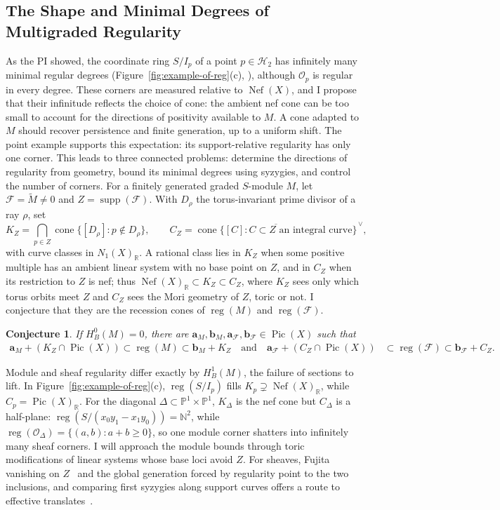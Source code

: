 \documentclass[11pt,reqno]{amsart}
\newtheorem{conjecture}[lemma]{Conjecture}
\theoremstyle{remark}
\newcommand{\reg}{\operatorname{reg}}
\newcommand{\Pic}{\operatorname{Pic}}
\newcommand{\supp}{\operatorname{supp}}
\newcommand{\Nef}{\operatorname{Nef}}
\newcommand{\cone}{\operatorname{cone}}
\renewcommand{\aa}{\mathbf{a}}
\newcommand{\bb}{\mathbf{b}}
\newcommand{\NN}{\mathbb{N}}
\newcommand{\PP}{\mathbb{P}}
\newcommand{\RR}{\mathbb{R}}
\newcommand{\cF}{\mathcal{F}}
\newcommand{\cH}{\mathcal{H}}
\newcommand{\cO}{\mathcal{O}}
\begin{document}
\subsection{The Shape and Minimal Degrees of Multigraded Regularity}\label{subsec:shape-of-regularity}
As the PI showed, the coordinate ring $S/I_p$ of a point $p\in\cH_2$ has infinitely many minimal regular degrees (Figure~\ref{fig:example-of-reg}(c), \cite{bruceHellerSayrafi22}), although $\cO_p$ is regular in every degree. These corners are measured relative to $\Nef(X)$, and I propose that their infinitude reflects the choice of cone: the ambient nef cone can be too small to account for the directions of positivity available to $M$. A cone adapted to $M$ should recover persistence and finite generation, up to a uniform shift. The point example supports this expectation: its support-relative regularity has only one corner. This leads to three connected problems: determine the directions of regularity from geometry, bound its minimal degrees using syzygies, and control the number of corners. For a finitely generated graded $S$-module $M$, let $\cF= \widetilde{M}\neq0$ and $Z=\supp(\cF)$. With $D_\rho$ the torus-invariant prime divisor of a ray $\rho$, set
\[
K_Z=\bigcap_{p\in Z}\cone\{[D_\rho]:p\notin D_\rho\},
\qquad
C_Z=\overline{\cone\{[C]:C\subset Z\text{ an integral curve}\}}^{\,\vee},
\]
with curve classes in $N_1(X)_{\RR}$. A rational class lies in $K_Z$ when some positive multiple has an ambient linear system with no base point on $Z$, and in $C_Z$ when its restriction to $Z$ is nef; thus $\Nef(X)_{\RR}\subset K_Z\subset C_Z$, where $K_Z$ sees only which torus orbits meet $Z$ and $C_Z$ sees the Mori geometry of $Z$, toric or not. I conjecture that they are the recession cones of $\reg(M)$ and $\reg(\cF)$.

\begin{conjecture}\label{conj:support-cone-duality}
If $H_B^0(M)=0$, there are $\aa_M,\bb_M,\aa_{\cF},\bb_{\cF}\in\Pic(X)$ such that
\[
\begin{aligned}
\aa_M+(K_Z\cap\Pic(X))\subset\reg(M)\subset\bb_M+K_Z \quad \text{and} \quad
\aa_{\cF}+(C_Z\cap\Pic(X))&\subset\reg(\cF)\subset\bb_{\cF}+C_Z.
\end{aligned}
\]
\end{conjecture}

Module and sheaf regularity differ exactly by $H_B^1(M)$, the failure of sections to lift. In Figure~\ref{fig:example-of-reg}(c), $\reg(S/I_p)$ fills $K_p\supsetneq\Nef(X)_{\RR}$, while $C_p=\Pic(X)_{\RR}$. For the diagonal $\Delta\subset\PP^1\times\PP^1$, $K_\Delta$ is the nef cone but $C_\Delta$ is a half-plane: $\reg(S/(x_0y_1-x_1y_0))=\NN^2$, while $\reg(\cO_\Delta)=\{(a,b):a+b\ge0\}$, so one module corner shatters into infinitely many sheaf corners. I will approach the module bounds through toric modifications of linear systems whose base loci avoid $Z$. For sheaves, Fujita vanishing on $Z$~\cite[Thm.~1.5]{keeler03} and the global generation forced by regularity point to the two inclusions, and comparing first syzygies along support curves offers a route to effective translates~\cite{maclaganSmith04}.
\end{document}
